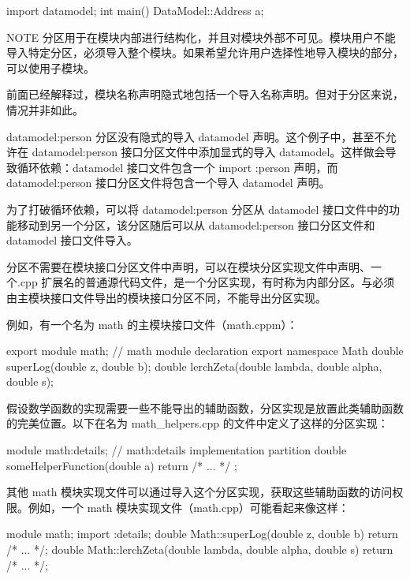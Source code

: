 \begin{cpp}
import datamodel;
int main() { DataModel::Address a; }
\end{cpp}

\begin{myNotic}{NOTE}
分区用于在模块内部进行结构化，并且对模块外部不可见。模块用户不能导入特定分区，必须导入整个模块。如果希望允许用户选择性地导入模块的部分，可以使用子模块。
\end{myNotic}

前面已经解释过，模块名称声明隐式地包括一个导入名称声明。但对于分区来说，情况并非如此。

datamodel:person 分区没有隐式的导入 datamodel 声明。这个例子中，甚至不允许在 datamodel:person 接口分区文件中添加显式的导入 datamodel。这样做会导致循环依赖：datamodel 接口文件包含一个 import :person 声明，而 datamodel:person 接口分区文件将包含一个导入 datamodel 声明。

为了打破循环依赖，可以将 datamodel:person 分区从 datamodel 接口文件中的功能移动到另一个分区，该分区随后可以从 datamodel:person 接口分区文件和 datamodel 接口文件导入。


分区不需要在模块接口分区文件中声明，可以在模块分区实现文件中声明、一个.cpp 扩展名的普通源代码文件，是一个分区实现，有时称为内部分区。与必须由主模块接口文件导出的模块接口分区不同，不能导出分区实现。

例如，有一个名为 math 的主模块接口文件（math.cppm）：

\begin{cpp}
export module math; // math module declaration
export namespace Math
{
    double superLog(double z, double b);
    double lerchZeta(double lambda, double alpha, double s);
}
\end{cpp}

假设数学函数的实现需要一些不能导出的辅助函数，分区实现是放置此类辅助函数的完美位置。以下在名为 math\_helpers.cpp 的文件中定义了这样的分区实现：

\begin{cpp}
module math:details; // math:details implementation partition
double someHelperFunction(double a) { return /* ... */ ; }
\end{cpp}

其他 math 模块实现文件可以通过导入这个分区实现，获取这些辅助函数的访问权限。例如，一个 math 模块实现文件（math.cpp）可能看起来像这样：

\begin{cpp}
module math;
import :details;
double Math::superLog(double z, double b) { return /* ... */; }
double Math::lerchZeta(double lambda, double alpha, double s) { return /* ... */; }
\end{cpp}

